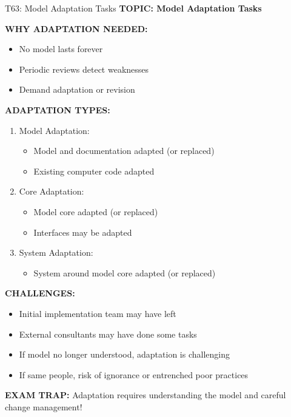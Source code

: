 \documentclass[8pt]{beamer}
\begin{document}
	\begin{frame}{T63: Model Adaptation Tasks}
		\fontsize{6.5}{7.5}\selectfont
		\textbf{TOPIC: Model Adaptation Tasks}
		
		\vspace{0.1cm}
		\textbf{WHY ADAPTATION NEEDED:}
		\begin{itemize}
			\item No model lasts forever
			\item Periodic reviews detect weaknesses
			\item Demand adaptation or revision
		\end{itemize}
		
		\vspace{0.1cm}
		\textbf{ADAPTATION TYPES:}
		\begin{enumerate}
			\item \textcolor{myblue}{Model Adaptation:}
			\begin{itemize}
				\item Model and documentation adapted (or replaced)
				\item Existing computer code adapted
			\end{itemize}
			\item \textcolor{myblue}{Core Adaptation:}
			\begin{itemize}
				\item Model core adapted (or replaced)
				\item Interfaces may be adapted
			\end{itemize}
			\item \textcolor{myblue}{System Adaptation:}
			\begin{itemize}
				\item System around model core adapted (or replaced)
			\end{itemize}
		\end{enumerate}
		
		\vspace{0.1cm}
		\textbf{CHALLENGES:}
		\begin{itemize}
			\item Initial implementation team may have left
			\item External consultants may have done some tasks
			\item If model no longer understood, adaptation is challenging
			\item If same people, risk of ignorance or entrenched poor practices
		\end{itemize}
		
		\textcolor{myred}{\textbf{EXAM TRAP:}} Adaptation requires \textcolor{myblue}{understanding the model and careful change management}!
	\end{frame}
	
\end{document}
